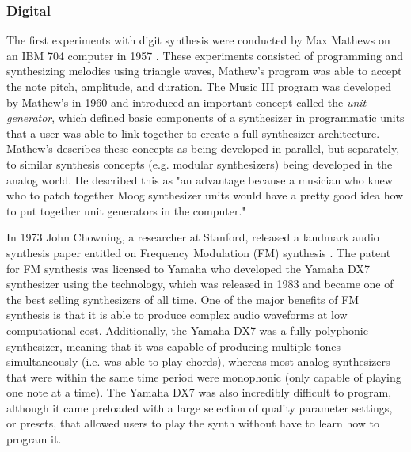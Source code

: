 \subsubsection{Digital}
The first experiments with digit synthesis were conducted by Max Mathews on an IBM 704 computer in 1957 \cite{roads1980interview}. These experiments consisted of programming and synthesizing melodies using triangle waves, Mathew's program was able to accept the note pitch, amplitude, and duration. The Music III program was developed by Mathew's in 1960 and introduced an important concept called the \textit{unit generator}, which defined basic components of a synthesizer in programmatic units that a user was able to link together to create a full synthesizer architecture. Mathew's describes these concepts as being developed in parallel, but separately, to similar synthesis concepts (e.g. modular synthesizers) being developed in the analog world. He described this as "an advantage because a musician who knew who to patch together Moog synthesizer units would have a pretty good idea how to put together unit generators in the computer."

In 1973 John Chowning, a researcher at Stanford, released a landmark audio synthesis paper entitled on Frequency Modulation (FM) synthesis \cite{chowning1973synthesis}. The patent for FM synthesis was licensed to Yamaha who developed the Yamaha DX7 synthesizer using the technology, which was released in 1983 and became one of the best selling synthesizers of all time. One of the major benefits of FM synthesis is that it is able to produce complex audio waveforms at low computational cost. Additionally, the Yamaha DX7 was a fully polyphonic synthesizer, meaning that it was capable of producing multiple tones simultaneously (i.e. was able to play chords), whereas most analog synthesizers that were within the same time period were monophonic (only capable of playing one note at a time). The Yamaha DX7 was also incredibly difficult to program, although it came preloaded with a large selection of quality parameter settings, or presets, that allowed users to play the synth without have to learn how to program it.

